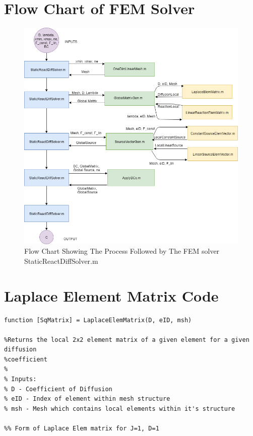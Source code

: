 \documentclass[11pt]{article}
\begin{document}
\begin{appendices}

\section{Flow Chart of FEM Solver}

\begin{figure}[ht]  %
	\centering
	\includegraphics[width=1\textwidth]{FLOW.png}
    \caption{Flow Chart Showing The Process Followed by The FEM solver StaticReactDiffSolver.m}\label{fig:flowchart}
\end{figure}
\clearpage
\section{Laplace Element Matrix Code}\label{ap:LaplaceElem}
\begin{lstlisting}
function [SqMatrix] = LaplaceElemMatrix(D, eID, msh)

%Returns the local 2x2 element matrix of a given element for a given diffusion
%coefficient
%
% Inputs: 
% D - Coefficient of Diffusion
% eID - Index of element within mesh structure
% msh - Mesh which contains local elements within it's structure

%% Form of Laplace Elem matrix for J=1, D=1


\end{lstlisting}
\end{appendices}
\end{document}
